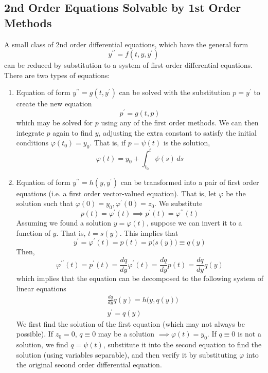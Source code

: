 \documentclass{article}
\theoremstyle{remark}
\theoremstyle{definition}
\begin{document}
\subsection{2nd Order Equations Solvable by 1st Order Methods}
A small class of 2nd order differential equations, which have the general form 
\[y^{\prime \prime} = f(t, y, y^\prime)\]
can be reduced by substitution to a system of first order differential equations. There are two types of equations: 
\begin{enumerate}
    \item Equation of form $y^{\prime \prime} = g(t, y^\prime)$ can be solved with the substitution $p = y^\prime$ to create the new equation 
    \[p^\prime = g(t, p)\]
    which may be solved for $p$ using any of the first order methods. We can then integrate $p$ again to find $y$, adjusting the extra constant to satisfy the initial conditions $\varphi(t_0) = y_0$. That is, if $p = \psi(t)$ is the solution, 
    \[\varphi (t) = y_0 + \int_{t_0}^t \psi (s) \,ds\]
    \item Equation of form $y^{\prime \prime} = h(y, y^\prime)$ can be transformed into a pair of first order equations (i.e. a first order vector-valued equation). That is, let $\varphi$ be the solution such that $\varphi(0) = y_0, \varphi^\prime(0) = z_0$. We substitute 
\[p(t) = \varphi^\prime (t) \implies p^\prime (t) = \varphi^{\prime \prime} (t)\]
Assuming we found a solution $y = \varphi(t)$, suppose we can invert it to a function of $y$. That is, $t = s(y)$. This implies that
\[y^\prime = \varphi^\prime (t) = p(t) = p\big( s(y) \big) \equiv q(y)\]
Then, 
\[\varphi^{\prime \prime} (t) = p^\prime (t) = \frac{d q}{d y} \varphi^\prime (t) = \frac{d q}{d y} p(t) = \frac{d q}{d y} q(y)\]
which implies that the equation can be decomposed to the following system of linear equations
\begin{align*}
    & \frac{d q}{d y} q (y) = h\big(y, q(y)\big) \\
    & y^\prime = q(y)
\end{align*}
We first find the solution of the first equation (which may not always be possible). If $z_0 = 0$, $q \equiv 0$ may be a solution $\implies \varphi(t) = y_0$. If $q \equiv 0$ is not a solution, we find $q = \psi (t)$, substitute it into the second equation to find the solution (using variables separable), and then verify it by substituting $\varphi$ into the original second order differential equation. 
\end{enumerate}
\end{document}
